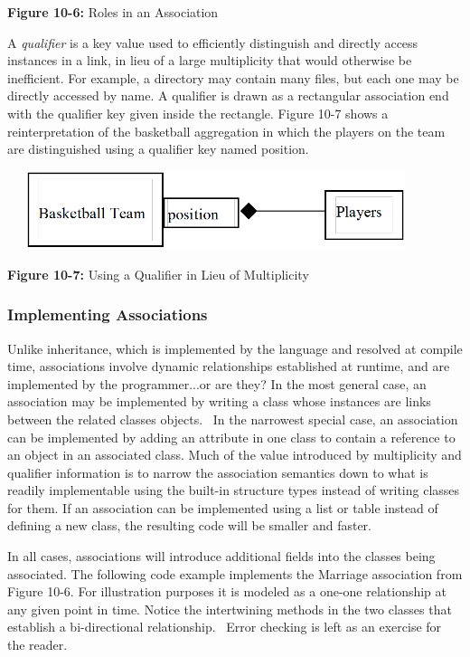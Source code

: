 {\sffamily\bfseries Figure 10-6:}
{\sffamily Roles in an Association}

\bigskip

A \textit{qualifier} is a key value used to efficiently
distinguish and directly access instances in a link, in lieu of a large
multiplicity that would otherwise be inefficient. For example, a
directory may contain many files, but each one may be directly accessed
by name. A qualifier is drawn as a rectangular association end with the
qualifier key given inside the rectangle. Figure 10-7 shows a
reinterpretation of the basketball aggregation in which the players on
the team are distinguished using a qualifier key named position.


\bigskip

\includegraphics[width=4.8in,height=0.9in]{ub-img/qualifier.png}

{\sffamily\bfseries Figure 10-7:}
{\sffamily Using a Qualifier in Lieu of Multiplicity}

\bigskip

\subsubsection{Implementing Associations}

Unlike inheritance, which is implemented by the language and resolved at
compile time, associations involve dynamic
relationships established at runtime, and are implemented by the
programmer...or are they? In the most general case, an association may
be implemented by writing a class whose instances are links between the
related classes{\textquotesingle} objects. \ In the narrowest special
case, an association can be implemented by adding an attribute in one
class to contain a reference to an object in an
associated class. Much of the value introduced by multiplicity and
qualifier information is to narrow the association semantics down to
what is readily implementable using the built-in structure types
instead of writing classes for them. If an association can be
implemented using a list or table instead of defining a new class, the
resulting code will be smaller and faster.

In all cases, associations will introduce additional fields into the
classes being associated. The following code example implements the
Marriage association from Figure 10-6. For illustration purposes it is
modeled as a one-one relationship at any given point in time. Notice
the intertwining methods in the two classes that establish a
bi-directional relationship. \ Error checking is left as an exercise
for the reader.

